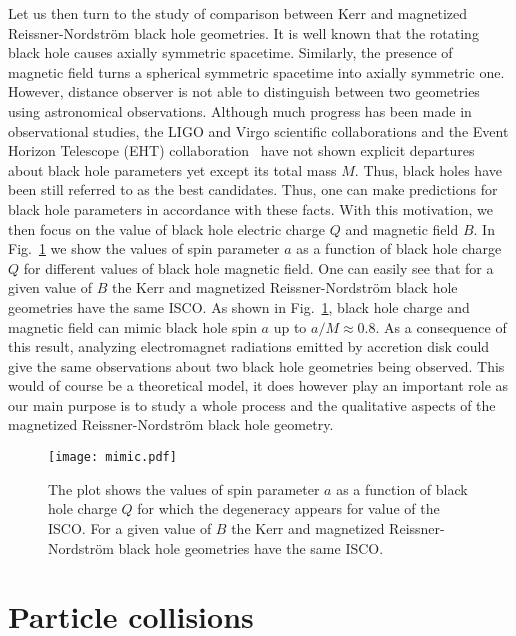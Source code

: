 \documentclass[showpacs,twocolumn,superscriptaddress]{revtex4}
\begin{document}
Let us then turn to the study of comparison between Kerr and magnetized Reissner-Nordstr\"{o}m black hole geometries. It is well known that the rotating black hole causes axially symmetric spacetime. Similarly, the presence of magnetic field turns a spherical symmetric spacetime into axially symmetric one. However, distance observer is not able to distinguish between two geometries using astronomical observations. Although much progress has been made in observational studies, the LIGO and Virgo scientific collaborations \cite{Abbott16a,Abbott16b} and the Event Horizon Telescope (EHT) collaboration~\cite{Akiyama19L1,Akiyama19L6} have not shown explicit departures about black hole parameters yet except its total mass $M$. Thus, black holes have been still referred to as the best candidates. Thus, one can make predictions for black hole parameters in accordance with these facts. With this motivation, we then focus on the value of black hole electric charge $Q$ and magnetic field $B$. In Fig.~\ref{fig:mimic} we show the values of spin parameter $a$ as a function of black hole charge $Q$ for different values of black hole magnetic field. One can easily see that for a given value of $B$ the Kerr and magnetized Reissner-Nordstr\"{o}m black hole geometries have the same ISCO.  As shown in Fig.~\ref{fig:mimic}, black hole charge and magnetic field can mimic black hole spin $a$ up to $a/M\approx 0.8$. As a consequence of this result, analyzing electromagnet radiations emitted by accretion disk could give the same observations about two black hole geometries being observed.  This would of course be a theoretical model, it does however play an important role as our main purpose is to study a whole process and the qualitative aspects of the magnetized Reissner-Nordstr\"{o}m black hole geometry. 

%
\begin{figure}

 \texttt{[image: mimic.pdf]}
 
\caption{\label{fig:mimic} The plot shows the values of spin parameter $a$ as a function of black hole charge $Q$ for which the degeneracy appears for value of the ISCO. For a given value of $B$ the Kerr and magnetized Reissner-Nordstr\"{o}m black hole geometries have the same ISCO.} \end{figure}



\section{Particle collisions}\label{Sec:4}
\end{document}
